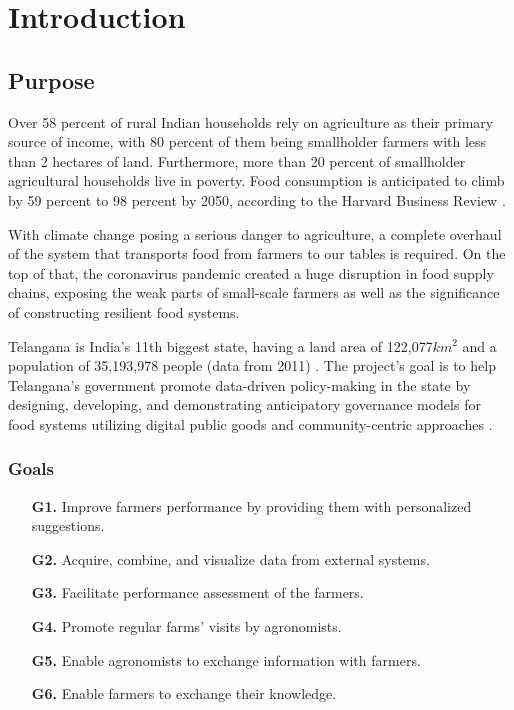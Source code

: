 \chapter{Introduction}

\section{Purpose}



Over 58 percent of rural Indian households rely on agriculture as their primary source of income, with 80 percent of them being smallholder farmers with less than 2 hectares of land. Furthermore, more than 20 percent of smallholder agricultural households live in poverty. Food consumption is anticipated to climb by 59 percent to 98 percent by 2050, according to the Harvard Business Review \cite{global_demand_for_food}.

With climate change posing a serious danger to agriculture, a complete overhaul of the system that transports food from farmers to our tables is required. On the top of that, the coronavirus pandemic created a huge disruption in food supply chains, exposing the weak parts of small-scale farmers as well as the significance of constructing resilient food systems.

Telangana is India's 11th biggest state, having a land area of 122,077$km^2$ and a population of 35,193,978 people (data from 2011) \cite{telangana}. The project's goal is to help Telangana’s government promote data-driven policy-making in the state by designing, developing, and demonstrating anticipatory governance models for food systems utilizing digital public goods and community-centric approaches \cite{reference_doc}.

\subsection{Goals} \label{subsec:goals}
\begin{itemize}
	\item [\textbf{G1.}] Improve farmers performance by providing them with personalized suggestions.
	\item [\textbf{G2.}] Acquire, combine, and visualize data from external systems. 
	\item [\textbf{G3.}] Facilitate performance assessment of the farmers.
	\item [\textbf{G4.}] Promote regular farms' visits by agronomists.
	\item [\textbf{G5.}] Enable agronomists to exchange information with farmers.
	\item [\textbf{G6.}] Enable farmers to exchange their knowledge.
\end{itemize}


